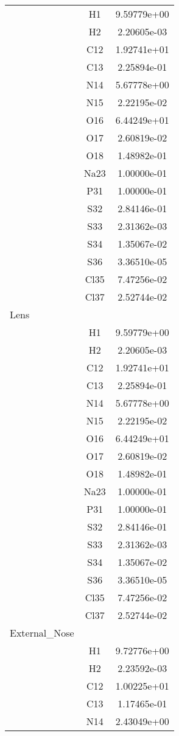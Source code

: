 \begin{centering}
\begin{longtable}{l c c}
\hline
& H1 & 9.59779e+00 \\ 
& H2 & 2.20605e-03 \\ 
& C12 & 1.92741e+01 \\ 
& C13 & 2.25894e-01 \\ 
& N14 & 5.67778e+00 \\ 
& N15 & 2.22195e-02 \\ 
& O16 & 6.44249e+01 \\ 
& O17 & 2.60819e-02 \\ 
& O18 & 1.48982e-01 \\ 
& Na23 & 1.00000e-01 \\ 
& P31 & 1.00000e-01 \\ 
& S32 & 2.84146e-01 \\ 
& S33 & 2.31362e-03 \\ 
& S34 & 1.35067e-02 \\ 
& S36 & 3.36510e-05 \\ 
& Cl35 & 7.47256e-02 \\ 
& Cl37 & 2.52744e-02 \\ 
\hline
Lens & & \\
\hline
& H1 & 9.59779e+00 \\ 
& H2 & 2.20605e-03 \\ 
& C12 & 1.92741e+01 \\ 
& C13 & 2.25894e-01 \\ 
& N14 & 5.67778e+00 \\ 
& N15 & 2.22195e-02 \\ 
& O16 & 6.44249e+01 \\ 
& O17 & 2.60819e-02 \\ 
& O18 & 1.48982e-01 \\ 
& Na23 & 1.00000e-01 \\ 
& P31 & 1.00000e-01 \\ 
& S32 & 2.84146e-01 \\ 
& S33 & 2.31362e-03 \\ 
& S34 & 1.35067e-02 \\ 
& S36 & 3.36510e-05 \\ 
& Cl35 & 7.47256e-02 \\ 
& Cl37 & 2.52744e-02 \\ 
\hline
External\_Nose & & \\
\hline
& H1 & 9.72776e+00 \\ 
& H2 & 2.23592e-03 \\ 
& C12 & 1.00225e+01 \\ 
& C13 & 1.17465e-01 \\ 
& N14 & 2.43049e+00 \\ 

\end{longtable}
\end{centering}
